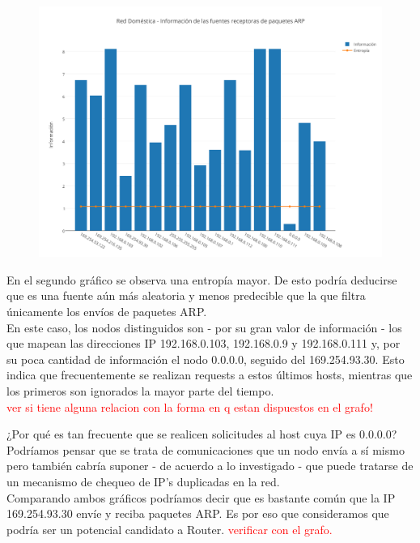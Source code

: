 \begin{figure}[h!]
    \centering                                                       
    \includegraphics[width=400pt]{img/RedDomesticaFuentesReceptorasARP}
    \caption{}
    \label{domesticaReceptoras}
\end{figure}

En el segundo gr\'afico se observa una entrop\'ia mayor. De esto podr\'ia deducirse que es una fuente a\'un m\'as aleatoria y menos predecible que la que filtra \'unicamente los env\'ios de paquetes ARP.\\
En este caso, los nodos distinguidos son - por su gran valor de informaci\'on - los que mapean las direcciones IP 192.168.0.103, 192.168.0.9 y 192.168.0.111 y, por su poca cantidad de informaci\'on el nodo 0.0.0.0, seguido del 169.254.93.30. Esto indica que frecuentemente se realizan requests a estos \'ultimos hosts, mientras que los primeros son ignorados la mayor parte del tiempo. \\
\textcolor{red}{ver si tiene alguna relacion con la forma en q estan dispuestos en el grafo!}

¿Por qu\'e es tan frecuente que se realicen solicitudes al host cuya IP es 0.0.0.0? Podr\'iamos pensar que se trata de comunicaciones que un nodo env\'ia a s\'i mismo pero tambi\'en cabr\'ia suponer - de acuerdo a lo investigado - que puede tratarse de un mecanismo de chequeo de IP's duplicadas en la red.\\

Comparando ambos gr\'aficos podr\'iamos decir que es bastante com\'un que la IP 169.254.93.30 env\'ie y reciba paquetes ARP. Es por eso que consideramos que podr\'ia ser un potencial candidato a Router. \textcolor{red}{verificar con el grafo.}

